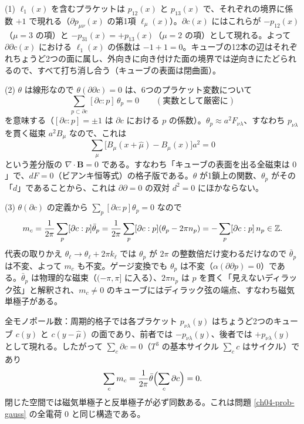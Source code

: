 \begin{solution}
(1) $\ell_1(x)$ を含むプラケットは $p_{12}(x)$ と $p_{13}(x)$ で、それぞれの境界に係数 $+1$ で現れる（$\partial p_{\mu\nu}(x)$ の第1項 $\ell_\mu(x)$）。$\partial c(x)$ にはこれらが $-p_{12}(x)$（$\mu=3$ の項）と $-p_{31}(x)=+p_{13}(x)$（$\mu=2$ の項）として現れる。よって $\partial\partial c(x)$ における $\ell_1(x)$ の係数は $-1+1=0$。キューブの12本の辺はそれぞれちょうど2つの面に属し、外向きに向き付けた面の境界では逆向きにたどられるので、すべて打ち消し合う（キューブの表面は閉曲面）。

(2) $\theta$ は線形なので $\theta(\partial\partial c)=0$ は、6つのプラケット変数について
\[
\sum_{p\subset\partial c}[\partial c:p]\,\theta_p=0\qquad(\text{実数として厳密に})
\]
を意味する（$[\partial c:p]=\pm1$ は $\partial c$ における $p$ の係数）。$\theta_p\approx a^2F_{\nu\lambda}$、すなわち $p_{\nu\lambda}$ を貫く磁束 $a^2B_\mu$ なので、これは
\[
\sum_\mu\bigl[B_\mu(x+\hat\mu)-B_\mu(x)\bigr]a^2=0
\]
という差分版の $\nabla\cdot\bm B=0$ である。すなわち「キューブの表面を出る全磁束は $0$」で、$dF=0$（ビアンキ恒等式）の格子版である。$\theta$ が1鎖上の関数、$\theta_p$ がその「$d$」であることから、これは $\partial\partial=0$ の双対 $d^2=0$ にほかならない。

(3) $\theta(\partial c)$ の定義から $\sum_p[\partial c:p]\theta_p=0$ なので
\[
m_c=\frac1{2\pi}\sum_p[\partial c:p]\bar\theta_p=\frac1{2\pi}\sum_p[\partial c:p](\theta_p-2\pi n_p)=-\sum_p[\partial c:p]\,n_p\in\mathbb{Z} .
\]
代表の取りかえ $\theta_\ell\to\theta_\ell+2\pi k_\ell$ では $\theta_p$ が $2\pi$ の整数倍だけ変わるだけなので $\bar\theta_p$ は不変、よって $m_c$ も不変。ゲージ変換でも $\theta_p$ は不変（$\alpha(\partial\partial p)=0$）である。$\bar\theta_p$ は物理的な磁束（$(-\pi,\pi]$ に入る）、$2\pi n_p$ は $p$ を貫く「見えないディラック弦」と解釈され、$m_c\neq0$ のキューブにはディラック弦の端点、すなわち磁気単極子がある。

全モノポール数：周期的格子では各プラケット $p_{\nu\lambda}(y)$ はちょうど2つのキューブ $c(y)$ と $c(y-\hat\mu)$ の面であり、前者では $-p_{\nu\lambda}(y)$、後者では $+p_{\nu\lambda}(y)$ として現れる。したがって $\sum_c\partial c=0$（$T^3$ の基本サイクル $\sum_cc$ はサイクル）であり
\[
\sum_cm_c=\frac1{2\pi}\bar\theta\Bigl(\sum_c\partial c\Bigr)=0 .
\]
閉じた空間では磁気単極子と反単極子が必ず同数ある。これは問題 \ref{ch04-prob-gauss} の全電荷 $0$ と同じ構造である。
\end{solution}

